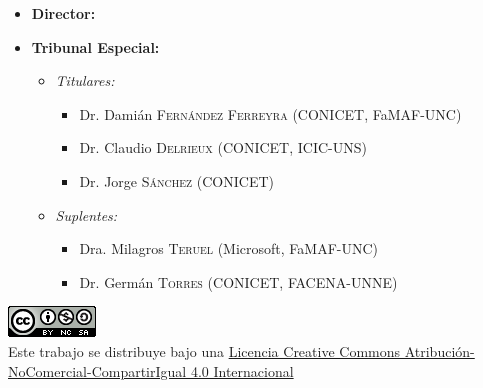 \documentclass[
11pt, %
spanish, %
singlespacing, %
toctotoc, %
headsepline, %
]{MastersDoctoralThesis} %
\begin{document}
\begin{titlepage}
\begin{center}
    \begin{itemize}[label={}]
        \item \textbf{Director:} {\normalsize \supname}
        \item \textbf{Tribunal Especial:}
        \normalsize
        \begin{itemize}[label={}]
            \item \emph{Titulares:}
            \begin{itemize}[label={}]
                \item Dr. Damián \textsc{Fernández Ferreyra} (CONICET, FaMAF-UNC)
                \item Dr. Claudio \textsc{Delrieux} (CONICET, ICIC-UNS)
                \item Dr. Jorge \textsc{Sánchez} (CONICET)
            \end{itemize}
            \item \emph{Suplentes:}
            \begin{itemize}[label={}]
                \item Dra. Milagros \textsc{Teruel} (Microsoft, FaMAF-UNC)
                \item Dr. Germán \textsc{Torres} (CONICET, FACENA-UNNE)
            \end{itemize}
        \end{itemize}
    \end{itemize}
    \vspace{1cm}

    \includegraphics{logo_cc_by_nc_sa.png} \\

    \small
    Este trabajo se distribuye bajo una \href{http://creativecommons.org/licenses/by-nc-sa/4.0/}{Licencia Creative Commons Atribución-NoComercial-CompartirIgual 4.0 Internacional}

\end{center}
\end{titlepage}

\end{document}
